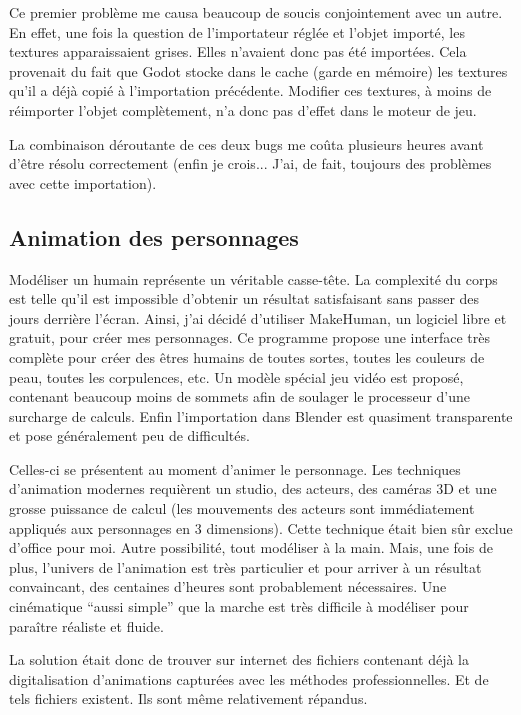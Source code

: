 Ce premier problème me causa beaucoup de soucis conjointement avec un autre. En effet, une fois la question de l'importateur réglée et l'objet importé, les textures apparaissaient grises. Elles n'avaient donc pas été importées. Cela provenait du fait que Godot stocke dans le cache (garde en mémoire) les textures qu'il a déjà copié à l'importation précédente. Modifier ces textures, à moins de réimporter l'objet complètement, n'a donc pas d'effet dans le moteur de jeu.

La combinaison déroutante de ces deux bugs me coûta plusieurs heures avant d'être résolu correctement (enfin je crois... J'ai, de fait, toujours des problèmes avec cette importation).

\subsection{Animation des personnages}
Modéliser un humain représente un véritable casse-tête. La complexité du corps est telle qu'il est impossible d'obtenir un résultat satisfaisant sans passer des jours derrière l'écran. Ainsi, j'ai décidé d'utiliser MakeHuman, un logiciel libre et gratuit, pour créer mes personnages. Ce programme propose une interface très complète pour créer des êtres humains de toutes sortes, toutes les couleurs de peau, toutes les corpulences, etc. Un modèle spécial jeu vidéo est proposé, contenant beaucoup moins de sommets afin de soulager le processeur d'une surcharge de calculs. Enfin l'importation dans Blender est quasiment transparente et pose généralement peu de difficultés.

Celles-ci se présentent au moment d'animer le personnage. Les techniques d'animation modernes requièrent un studio, des acteurs, des caméras 3D et une grosse puissance de calcul (les mouvements des acteurs sont immédiatement appliqués aux personnages en 3 dimensions). Cette technique était bien sûr exclue d'office pour moi. Autre possibilité, tout modéliser à la main. Mais, une fois de plus, l'univers de l'animation est très particulier et pour arriver à un résultat convaincant, des centaines d'heures sont probablement nécessaires. Une cinématique \enquote{aussi simple} que la marche est très difficile à modéliser pour paraître réaliste et fluide.

La solution était donc de trouver sur internet des fichiers contenant déjà la digitalisation d'animations capturées avec les méthodes professionnelles. Et de tels fichiers existent. Ils sont même relativement répandus.


